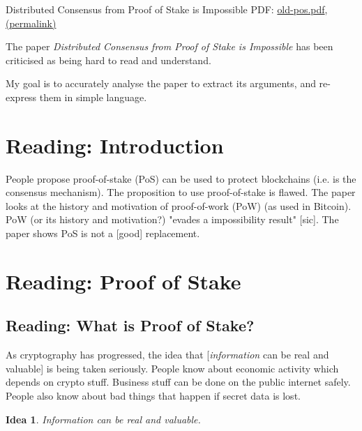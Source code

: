 \documentclass{article}
\newtheorem{idea}{Idea}
\begin{document}
Distributed Consensus from Proof of Stake is Impossible PDF: \href{../../files/pdfs/2014-05-28-distributed-consensus-pos/old-pos.pdf}{old-pos.pdf}, \href{https://xertrov.github.io/fi/files/pdfs/2014-05-28-distributed-consensus-pos/old-pos.pdf}{(permalink)}

The paper \emph{Distributed Consensus from Proof of Stake is Impossible} has been criticised as being hard to read and understand.

My goal is to accurately analyse the paper to extract its arguments, and re-express them in simple language.


\tableofcontents

\section{Reading: Introduction}

People propose proof-of-stake (PoS) can be used to protect blockchains (i.e. is the consensus mechanism).
The proposition to use proof-of-stake is flawed.
The paper looks at the history and motivation of proof-of-work (PoW) (as used in Bitcoin).
PoW (or its history and motivation?) "evades a impossibility result" [sic].
The paper shows PoS is not a [good] replacement.

\section{Reading: Proof of Stake}

\subsection{Reading: What is Proof of Stake?}

As cryptography has progressed, the idea that [\emph{information} can be real and valuable] is being taken seriously.
People know about economic activity which depends on crypto stuff.
Business stuff can be done on the public internet safely.
People also know about bad things that happen if secret data is lost.

\begin{idea} \label{def:inforeal}
    Information can be real and valuable.
\end{idea}
\end{document}
